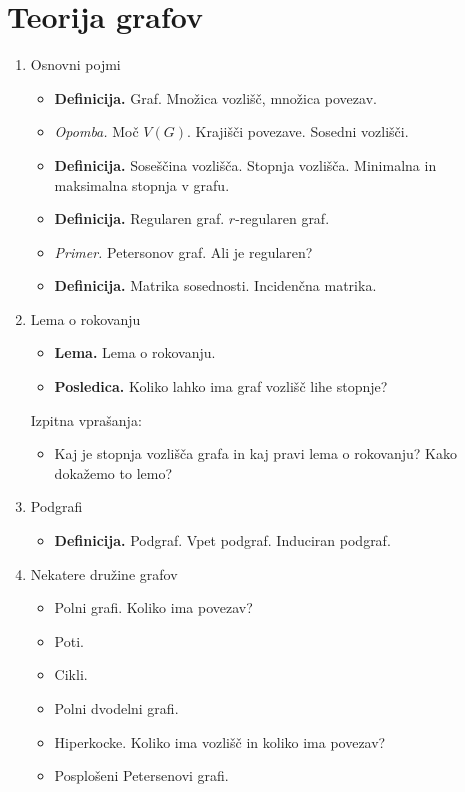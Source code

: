 \section{Teorija grafov}

\begin{enumerate}
    \item Osnovni pojmi
    \begin{itemize}
        \item \colorbox{purple!30}{\textbf{Definicija.}} Graf. Množica vozlišč, množica povezav.
        \item \colorbox{yellow!30}{\emph{Opomba.}} Moč \(V(G)\). Krajišči povezave. Sosedni vozlišči.
        \item \colorbox{purple!30}{\textbf{Definicija.}} Soseščina vozlišča. Stopnja vozlišča. Minimalna in maksimalna stopnja v grafu.
        \item \colorbox{purple!30}{\textbf{Definicija.}} Regularen graf. \(r\)-regularen graf.
        \item \colorbox{yellow!30}{\emph{Primer.}} Petersonov graf. Ali je regularen?
        \item \colorbox{purple!30}{\textbf{Definicija.}} Matrika sosednosti. Incidenčna matrika.
    \end{itemize}

    \item Lema o rokovanju
    \begin{itemize}
        \item \colorbox{blue!30}{\textbf{Lema.}} Lema o rokovanju.
        \item \colorbox{orange!30}{\textbf{Posledica.}} Koliko lahko ima graf vozlišč lihe stopnje?
    \end{itemize}

    Izpitna vprašanja:
    \begin{itemize}
        \item Kaj je stopnja vozlišča grafa in kaj pravi lema o rokovanju? Kako dokažemo to lemo?
    \end{itemize}    

    \item Podgrafi
    \begin{itemize}
        \item \colorbox{purple!30}{\textbf{Definicija.}} Podgraf. Vpet podgraf. Induciran podgraf.
    \end{itemize}

    \item Nekatere družine grafov
    \begin{itemize}
        \item Polni grafi. Koliko ima povezav?
        \item Poti.
        \item Cikli.
        \item Polni dvodelni grafi.
        \item Hiperkocke. Koliko ima vozlišč in koliko ima povezav?
        \item Posplošeni Petersenovi grafi.
    \end{itemize}


\end{enumerate}
